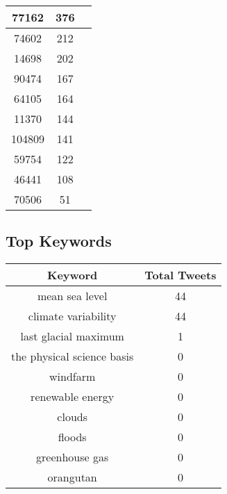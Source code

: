 \documentclass{article}\usepackage[T1]{fontenc}
\begin{document}
\begin{tabular}{|c|c|c|}
 \hline
77162 & 376\\ 
 \hline
74602 & 212\\ 
 \hline
14698 & 202\\ 
 \hline
90474 & 167\\ 
 \hline
64105 & 164\\ 
 \hline
11370 & 144\\ 
 \hline
104809 & 141\\ 
 \hline
59754 & 122\\ 
 \hline
46441 & 108\\ 
 \hline
70506 & 51\\ 
 \hline
\end{tabular}\subsection*{Top Keywords}\begin{tabular}{|c|c|}         \hline         Keyword & Total Tweets \\ 
 \hline
mean sea level & 44\\ 
 \hline
climate variability & 44\\ 
 \hline
last glacial maximum & 1\\ 
 \hline
the physical science basis & 0\\ 
 \hline
windfarm & 0\\ 
 \hline
renewable energy & 0\\ 
 \hline
clouds & 0\\ 
 \hline
floods & 0\\ 
 \hline
greenhouse gas & 0\\ 
 \hline
orangutan & 0\\ 
 \hline
\end{tabular}
\end{document}
